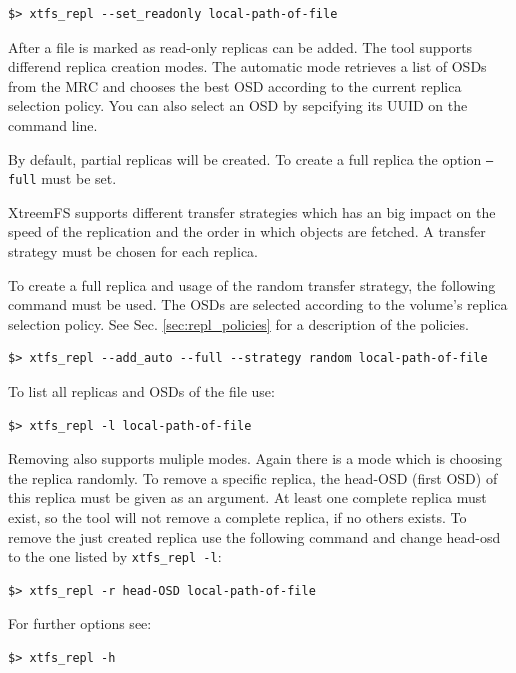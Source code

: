 \documentclass[a4paper,10pt]{book}
\begin{document}
\begin{verbatim}
$> xtfs_repl --set_readonly local-path-of-file
\end{verbatim}

After a file is marked as read-only replicas can be added. The tool supports differend replica creation modes. The automatic mode retrieves a list of OSDs from the MRC and chooses the best OSD according to the current replica selection policy. You can also select an OSD by sepcifying its UUID on the command line.

By default, partial replicas will be created. To create a full replica the option \texttt{--full} must be set.

XtreemFS supports different transfer strategies which has an big impact on the speed of the replication and the order in which objects are fetched. A transfer strategy must be chosen for each replica.

To create a full replica and usage of the random transfer strategy, the following command must be used. The OSDs are selected according to the volume's replica selection policy. See Sec. \ref{sec:repl_policies} for a description of the policies.

\begin{verbatim}
$> xtfs_repl --add_auto --full --strategy random local-path-of-file
\end{verbatim}

To list all replicas and OSDs of the file use:

\begin{verbatim}
$> xtfs_repl -l local-path-of-file
\end{verbatim}

Removing also supports muliple modes. Again there is a mode which is choosing the replica randomly. To remove a specific replica, the head-OSD (first OSD) of this replica must be given as an argument. At least one complete replica must exist, so the tool will not remove a complete replica, if no others exists. To remove the just created replica use the following command and change head-osd to the one listed by \texttt{xtfs\_repl -l}:

\begin{verbatim}
$> xtfs_repl -r head-OSD local-path-of-file
\end{verbatim}

For further options see:

\begin{verbatim}
$> xtfs_repl -h
\end{verbatim}
\end{document}
